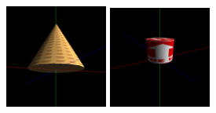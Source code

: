 \documentclass[12pt, a4paper]{article}
\begin{document}
\begin{figure}[H]
    \includegraphics[width=0.3\textwidth]{res/phase4/results/Cone.png}
    \includegraphics[width=0.3\textwidth]{res/phase4/results/CylinderSingleTexture.png}
\end{figure}
\end{document}
